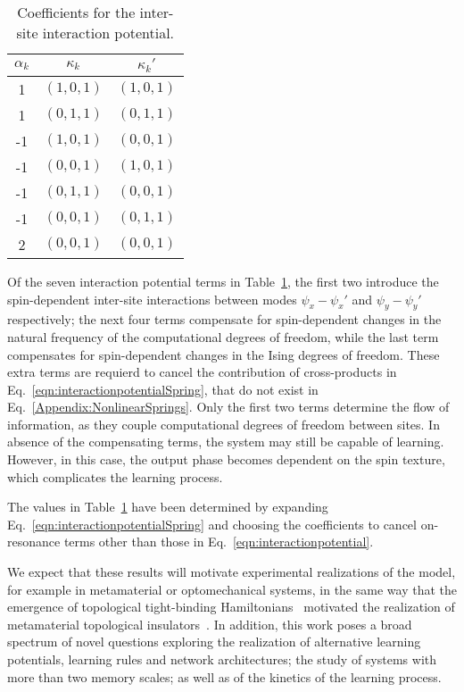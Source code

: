 \begin{table}[ht]
    \centering
    \begin{tabular}{|c|c|c|}
    \hline
    $\alpha_k$ & $\kappa_k$ & $\kappa_k'$ \\
    \hline
    1 & $(1,0,1)$ & $(1,0,1)$ \\
    1 & $(0,1,1)$ & $(0,1,1)$ \\
    \hline
    -1 & $(1,0,1)$ & $(0,0,1)$ \\
    -1 & $(0,0,1)$ & $(1,0,1)$ \\
    -1  & $(0,1,1)$ & $(0,0,1)$ \\
    -1  & $(0,0,1)$ & $(0,1,1)$ \\
    \hline
    2  & $(0,0,1)$ & $(0,0,1)$ \\
    \hline
    \end{tabular}
    \caption{Coefficients for the inter-site interaction potential. }
    \label{tab:coefficients}
\end{table}
Of the seven interaction potential terms in Table~\ref{tab:coefficients}, the first two introduce the spin-dependent inter-site interactions between modes $\psi_x-\psi_x'$ and $\psi_y-\psi_y'$ respectively; the next four terms compensate for spin-dependent changes in the natural frequency of the computational degrees of freedom, while the last term compensates for spin-dependent changes in the Ising degrees of freedom. These extra terms are requierd to cancel the contribution of cross-products in Eq.~\ref{eqn:interactionpotentialSpring}, that do not exist in Eq.~\ref{Appendix:NonlinearSprings}. Only the first two terms determine the flow of information, as they couple computational degrees of freedom between sites. In absence of the compensating terms, the system may still be capable of learning. However, in this case, the output phase becomes dependent on the spin texture, which complicates the learning process.

The values in Table~\ref{tab:coefficients} have been determined by expanding Eq.~\ref{eqn:interactionpotentialSpring} and choosing the coefficients to cancel on-resonance terms other than those in Eq.~\ref{eqn:interactionpotential}.

 We expect that these results will motivate experimental realizations of the model, for example in metamaterial or optomechanical systems, in the same way that the emergence of topological tight-binding Hamiltonians~\cite{benalcazar2017quantized} motivated the realization of metamaterial topological insulators~\cite{serra2018observation, peterson2018quantized, matlack2018designing}. In addition, this work poses a broad spectrum of novel questions exploring the realization of alternative learning potentials, learning rules and network architectures; the study of systems with more than two memory scales; as well as of the kinetics of the learning process.